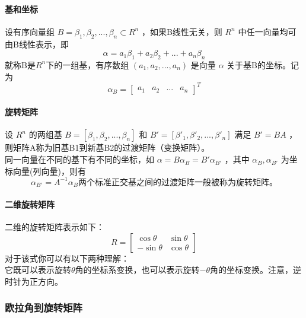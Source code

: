 \paragraph{基和坐标}
设有序向量组 $B={\beta_1,\beta_2,...,\beta_n} \subset R^n$ ，如果B线性无关，则 $R^n$ 中任一向量均可由B线性表示，即
\begin{equation}
  \alpha=a_1 \beta_1 + a_2 \beta_2 + ... + a_n \beta_n
\end{equation}
就称B是$R^n$下的一组基，有序数组 $(a_1,a_2,...,a_n)$ 是向量 $\alpha$ 关于基B的坐标。记为
\begin{equation}
  \alpha_B =
  \begin{bmatrix}
    a_1 & a_2 & ... & a_n
  \end{bmatrix}^T
\end{equation}
\paragraph{旋转矩阵}
设 $R^n$ 的两组基 $B=[\beta_1,\beta_2,...,\beta_n]$ 和 $B'=[\beta '_1,\beta '_2,...,\beta '_n]$ 满足 $B' = B A$ ，则矩阵A称为旧基B1到新基B2的过渡矩阵（变换矩阵）。
\\
同一向量在不同的基下有不同的坐标，如 $ \alpha = B \alpha_{B} = B' \alpha_{B'}$ ，其中 $\alpha_{B},\alpha_{B'}$ 为坐标向量(列向量)，则有
\begin{equation}
  \alpha_{B'} = A^{-1} \alpha_{B}
  两个标准正交基之间的过渡矩阵一般被称为旋转矩阵。
\end{equation}
\paragraph{二维旋转矩阵}
二维的旋转矩阵表示如下：
\begin{equation}
  R =
  \begin{bmatrix}
    \cos \theta  & \sin \theta \\
    -\sin \theta & \cos \theta
  \end{bmatrix}
\end{equation}
对于该式你可以有以下两种理解：\\
它既可以表示旋转$\theta$角的坐标系变换，也可以表示旋转$-\theta$角的坐标变换。注意，逆时针为正方向。
\subsubsection{欧拉角到旋转矩阵}
